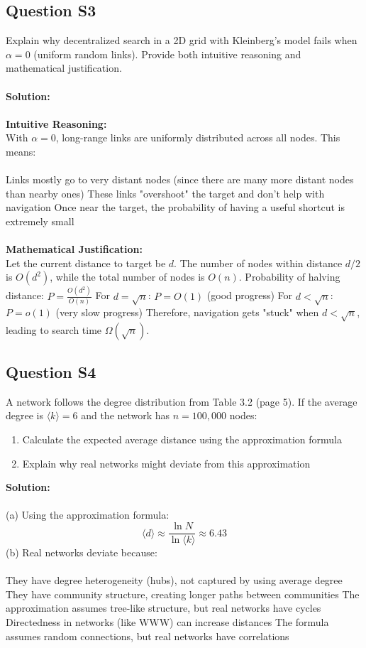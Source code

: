 \documentclass[11pt,a4paper]{article}
\theoremstyle{definition}
\begin{document}
\subsection{Question S3}
Explain why decentralized search in a 2D grid with Kleinberg's model fails when $\alpha = 0$ (uniform random links). Provide both intuitive reasoning and mathematical justification.\\
\\
\textbf{Solution:}\\
\\
\textbf{Intuitive Reasoning:}\\
With $\alpha = 0$, long-range links are uniformly distributed across all nodes. This means:\\
\\
Links mostly go to very distant nodes (since there are many more distant nodes than nearby ones) These links "overshoot" the target and don't help with navigation
Once near the target, the probability of having a useful shortcut is extremely small\\
\\
\textbf{Mathematical Justification:}\\
Let the current distance to target be $d$. The number of nodes within distance $d/2$ is $O(d^2)$, while the total number of nodes is $O(n)$.
Probability of halving distance: $P = \frac{O(d^2)}{O(n)}$
For $d = \sqrt{n}$: $P = O(1)$ (good progress)
For $d < \sqrt{n}$: $P = o(1)$ (very slow progress)
Therefore, navigation gets "stuck" when $d < \sqrt{n}$, leading to search time $\Omega(\sqrt{n})$.
\subsection{Question S4}
A network follows the degree distribution from Table 3.2 (page 5). If the average degree is $\langle k \rangle = 6$ and the network has $n = 100,000$ nodes:
\begin{enumerate}[label=(\alph*)]
\item Calculate the expected average distance using the approximation formula
\item Explain why real networks might deviate from this approximation
\end{enumerate}
\textbf{Solution:}\\
\\
(a) Using the approximation formula:\\
$$
\langle d\rangle \approx \frac{\ln N}{\ln \langle k\rangle} \approx 6.43
$$
(b) Real networks deviate because:\\
\\
They have degree heterogeneity (hubs), not captured by using average degree
They have community structure, creating longer paths between communities
The approximation assumes tree-like structure, but real networks have cycles
Directedness in networks (like WWW) can increase distances
The formula assumes random connections, but real networks have correlations
\end{document}
